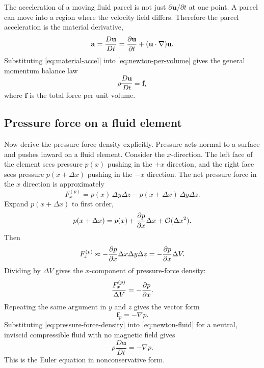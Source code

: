 \documentclass[11pt]{article}
\newcommand{\uvec}{\mathbf{u}}
\begin{document}
The acceleration of a moving fluid parcel is not just $\partial \uvec/\partial t$ at one point. A parcel can move into a region where the velocity field differs. Therefore the parcel acceleration is the material derivative,
\begin{equation}
\mathbf{a}=\frac{D\uvec}{Dt}=\pdv{\uvec}{t}+(\uvec\cdot\nabla)\uvec.
\label{eq:material-accel}
\end{equation}
Substituting \eqref{eq:material-accel} into \eqref{eq:newton-per-volume} gives the general momentum balance law
\begin{equation}
\rho\frac{D\uvec}{Dt}=\mathbf{f},
\label{eq:newton-fluid}
\end{equation}
where $\mathbf{f}$ is the total force per unit volume.

\subsection{Pressure force on a fluid element}
Now derive the pressure-force density explicitly. Pressure acts normal to a surface and pushes inward on a fluid element. Consider the $x$-direction. The left face of the element sees pressure $p(x)$ pushing in the $+x$ direction, and the right face sees pressure $p(x+\Delta x)$ pushing in the $-x$ direction. The net pressure force in the $x$ direction is approximately
\begin{equation}
F_x^{(p)} = p(x)\,\Delta y\Delta z - p(x+\Delta x)\,\Delta y\Delta z.
\label{eq:pressure-force-x}
\end{equation}
Expand $p(x+\Delta x)$ to first order,
\begin{equation}
p(x+\Delta x)=p(x)+\pdv{p}{x}\Delta x + \mathcal{O}(\Delta x^2).
\label{eq:taylor-pressure}
\end{equation}
Then
\begin{equation}
F_x^{(p)} \approx -\pdv{p}{x}\Delta x\Delta y\Delta z = -\pdv{p}{x}\Delta V.
\label{eq:pressure-force-x-2}
\end{equation}
Dividing by $\Delta V$ gives the $x$-component of pressure-force density:
\begin{equation}
\frac{F_x^{(p)}}{\Delta V} = -\pdv{p}{x}.
\label{eq:pressure-force-density-x}
\end{equation}
Repeating the same argument in $y$ and $z$ gives the vector form
\begin{equation}
\mathbf{f}_p = -\nabla p.
\label{eq:pressure-force-density}
\end{equation}
Substituting \eqref{eq:pressure-force-density} into \eqref{eq:newton-fluid} for a neutral, inviscid compressible fluid with no magnetic field gives
\begin{equation}
\rho\frac{D\uvec}{Dt} = -\nabla p.
\label{eq:euler-lagrangian}
\end{equation}
This is the Euler equation in nonconservative form.
\end{document}
